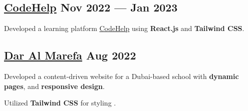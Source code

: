 \subsection{{\href{https://www.thecodehelp.in}{CodeHelp} \hfill Nov 2022 --- Jan 2023}}
\begin{zitemize}
\item Developed a learning platform \href{https://www.thecodehelp.in}{CodeHelp} using \textbf{React.js} and \textbf{Tailwind CSS}.
\end{zitemize}

\subsection{{\href{https://www.daralmarefa.ae}{Dar Al Marefa} \hfill Aug 2022}}
\begin{zitemize}
\item Developed a content-driven website for a Dubai-based school with \textbf{dynamic pages}, and \textbf{responsive design}.
\item Utilized \textbf{Tailwind CSS} for styling .
\end{zitemize}
